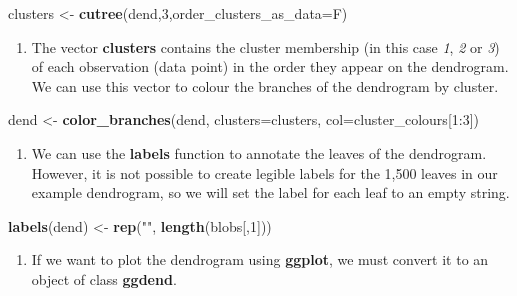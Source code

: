 \documentclass[]{book}
\newenvironment{Shaded}{\begin{snugshade}}{\end{snugshade}}
\newcommand{\KeywordTok}[1]{\textcolor[rgb]{0.13,0.29,0.53}{\textbf{{#1}}}}
\newcommand{\DataTypeTok}[1]{\textcolor[rgb]{0.13,0.29,0.53}{{#1}}}
\newcommand{\DecValTok}[1]{\textcolor[rgb]{0.00,0.00,0.81}{{#1}}}
\newcommand{\StringTok}[1]{\textcolor[rgb]{0.31,0.60,0.02}{{#1}}}
\newcommand{\NormalTok}[1]{{#1}}
\providecommand{\tightlist}{%
  \setlength{\itemsep}{0pt}\setlength{\parskip}{0pt}}
\theoremstyle{definition}
\theoremstyle{definition}
\theoremstyle{definition}
\theoremstyle{remark}
\begin{document}
\begin{Shaded}
\begin{Highlighting}[]
\NormalTok{clusters <-}\StringTok{ }\KeywordTok{cutree}\NormalTok{(dend,}\DecValTok{3}\NormalTok{,}\DataTypeTok{order_clusters_as_data=}\NormalTok{F)}
\end{Highlighting}
\end{Shaded}

\begin{enumerate}
\def\labelenumi{\arabic{enumi}.}
\setcounter{enumi}{6}
\tightlist
\item
  The vector \textbf{clusters} contains the cluster membership (in this
  case \emph{1}, \emph{2} or \emph{3}) of each observation (data point)
  in the order they appear on the dendrogram. We can use this vector to
  colour the branches of the dendrogram by cluster.
\end{enumerate}

\begin{Shaded}
\begin{Highlighting}[]
\NormalTok{dend <-}\StringTok{ }\KeywordTok{color_branches}\NormalTok{(dend, }\DataTypeTok{clusters=}\NormalTok{clusters, }\DataTypeTok{col=}\NormalTok{cluster_colours[}\DecValTok{1}\NormalTok{:}\DecValTok{3}\NormalTok{])}
\end{Highlighting}
\end{Shaded}

\begin{enumerate}
\def\labelenumi{\arabic{enumi}.}
\setcounter{enumi}{7}
\tightlist
\item
  We can use the \textbf{labels} function to annotate the leaves of the
  dendrogram. However, it is not possible to create legible labels for
  the 1,500 leaves in our example dendrogram, so we will set the label
  for each leaf to an empty string.
\end{enumerate}

\begin{Shaded}
\begin{Highlighting}[]
\KeywordTok{labels}\NormalTok{(dend) <-}\StringTok{ }\KeywordTok{rep}\NormalTok{(}\StringTok{""}\NormalTok{, }\KeywordTok{length}\NormalTok{(blobs[,}\DecValTok{1}\NormalTok{]))}
\end{Highlighting}
\end{Shaded}

\begin{enumerate}
\def\labelenumi{\arabic{enumi}.}
\setcounter{enumi}{8}
\tightlist
\item
  If we want to plot the dendrogram using \textbf{ggplot}, we must
  convert it to an object of class \textbf{ggdend}.
\end{enumerate}
\end{document}
